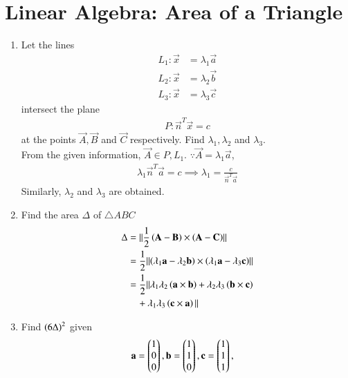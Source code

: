\documentclass[journal,12pt,twocolumn]{IEEEtran}
\renewcommand\thesection{\arabic{section}}
\begin{document}
\section{Linear Algebra: Area of a Triangle}
\begin{enumerate}[label=\thesection.\arabic*
,ref=\thesection.\theenumi]

\item Let  the lines
\begin{align}
L_1: \vec{x} &=  \lambda_1 \vec{a}
\\
L_2: \vec{x} &=  \lambda_2 \vec{b}
\\
L_3: \vec{x} &=  \lambda_3 \vec{c}
\end{align}
%
intersect the plane 
\begin{align}
P: \vec{n}^{T}\vec{x} = c
\end{align}
%
at the points $\vec{A},\vec{B}$ and $\vec{C}$ respectively. 
Find $\lambda_1,\lambda_2$ and $\lambda_3$.
\\
\solution 
From the given information, $\vec{A} \in P, L_1$. $\because \vec{A} = \lambda_1 \vec{a}$,
\begin{align}
\label{eq:18_lambda}
\lambda_1\vec{n}^T\vec{a} = c \implies \lambda_1 =  \frac{c}{\vec{n}^T\vec{a}}
\end{align}
%
Similarly, $\lambda_2$ and $\lambda_3$ are obtained.
\item Find the area $\Delta$ of $\triangle ABC$  
\\
\solution 
\begin{align}
\Delta &= \lVert\frac{1}{2}\left(\mathbf{A}-\mathbf{B}\right)\times\left(\mathbf{A}-\mathbf{C}\right)\rVert
\nonumber \\
&= \frac{1}{2}\lVert\left(\lambda_1\mathbf{a}-\lambda_2\mathbf{b}\right)\times\left(\lambda_1\mathbf{a}-\lambda_3\mathbf{c}\right)\rVert
\nonumber \\
&= \frac{1}{2}\Vert\lambda_1\lambda_2\left(\mathbf{a}\times \mathbf{b}\right)+\lambda_2\lambda_3\left(\mathbf{b}\times \mathbf{c}\right)
\nonumber \\ 
&\quad +\lambda_1\lambda_3\left(\mathbf{c}\times\mathbf{a}\right)\Vert
\end{align}
\item Find  $\left(6\Delta\right)^2$ given 
\begin{align}
 \vec{a} &= \myvec{1 \\ 0\\ 0},
 \vec{b} = \myvec{1 \\ 1\\ 0},
 \vec{c} = \myvec{1 \\ 1\\ 1},

\end{align}
\end{enumerate}
\end{document}
